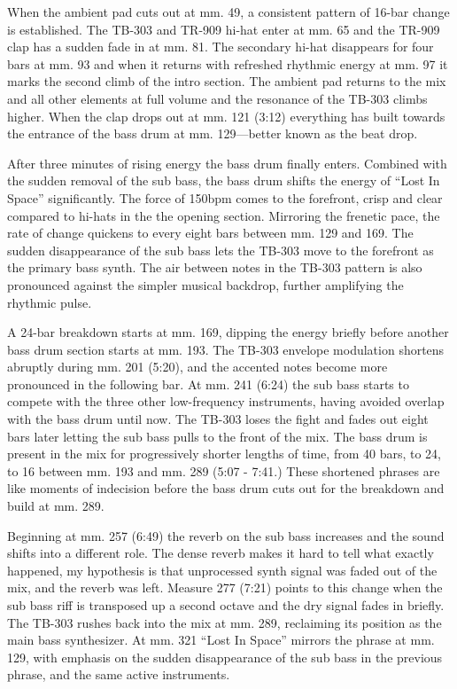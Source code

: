 \documentclass[12pt,twoside]{reedthesis}
\begin{document}
When the ambient pad cuts out at mm. 49, a consistent pattern of 16-bar change is established. The TB-303 and TR-909 hi-hat enter at mm. 65 and the TR-909 clap has a sudden fade in at mm. 81. The secondary hi-hat disappears for four bars at mm. 93 and when it returns with refreshed rhythmic energy at mm. 97 it marks the second climb of the intro section. The ambient pad returns to the mix and all other elements at full volume and the resonance of the TB-303 climbs higher. When the clap drops out at mm. 121 (3:12) everything has built towards the entrance of the bass drum at mm. 129---better known as the beat drop.

After three minutes of rising energy the bass drum finally enters. Combined with the sudden removal of the sub bass, the bass drum shifts the energy of ``Lost In Space'' significantly. The force of 150bpm comes to the forefront, crisp and clear compared to hi-hats in the the opening section. Mirroring the frenetic pace, the rate of change quickens to every eight bars between mm. 129 and 169. The sudden disappearance of the sub bass lets the TB-303 move to the forefront as the primary bass synth. The air between notes in the TB-303 pattern is also pronounced against the simpler musical backdrop, further amplifying the rhythmic pulse.

A 24-bar breakdown starts at mm. 169, dipping the energy briefly before another bass drum section starts at mm. 193. The TB-303 envelope modulation shortens abruptly during mm. 201 (5:20), and the accented notes become more pronounced in the following bar. At mm. 241 (6:24) the sub bass starts to compete with the three other low-frequency instruments, having avoided overlap with the bass drum until now. The TB-303 loses the fight and fades out eight bars later letting the sub bass pulls to the front of the mix. The bass drum is present in the mix for progressively shorter lengths of time, from 40 bars, to 24, to 16 between mm. 193 and mm. 289 (5:07 - 7:41.) These shortened phrases are like moments of indecision before the bass drum cuts out for the breakdown and build at mm. 289.

Beginning at mm. 257 (6:49) the reverb on the sub bass increases and the sound shifts into a different role. The dense reverb makes it hard to tell what exactly happened, my hypothesis is that unprocessed synth signal was faded out of the mix, and the reverb was left. Measure 277 (7:21) points to this change when the sub bass riff is transposed up a second octave and the dry signal fades in briefly. The TB-303 rushes back into the mix at mm. 289, reclaiming its position as the main bass synthesizer. At mm. 321 ``Lost In Space'' mirrors the phrase at mm. 129, with emphasis on the sudden disappearance of the sub bass in the previous phrase, and the same active instruments.
\end{document}
